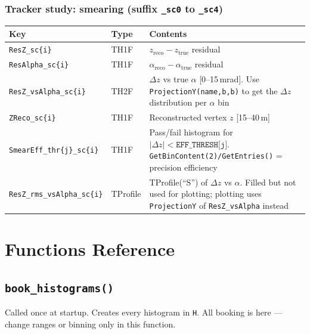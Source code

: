 \documentclass[11pt]{article}
\begin{document}
\subsubsection*{Tracker study: smearing (suffix \texttt{\_sc0} to \texttt{\_sc4})}
\begin{longtable}{p{4.8cm}lp{5.7cm}}
\toprule
Key & Type & Contents \\
\midrule
\texttt{ResZ\_sc\{i\}} & TH1F & $z_\text{reco} - z_\text{true}$ residual \\
\texttt{ResAlpha\_sc\{i\}} & TH1F & $\alpha_\text{reco} - \alpha_\text{true}$ residual \\
\texttt{ResZ\_vsAlpha\_sc\{i\}} & TH2F & $\Delta z$ vs true $\alpha$ [0--15\,mrad].
                                         Use \texttt{ProjectionY(name,b,b)} to get
                                         the $\Delta z$ distribution per $\alpha$ bin \\
\texttt{ZReco\_sc\{i\}} & TH1F & Reconstructed vertex $z$ [15--40\,m] \\
\texttt{SmearEff\_thr\{j\}\_sc\{i\}} & TH1F & Pass/fail histogram for
                                              $|\Delta z| < \texttt{EFF\_THRESH[j]}$.
                                              \texttt{GetBinContent(2)/GetEntries()}
                                              = precision efficiency \\
\texttt{ResZ\_rms\_vsAlpha\_sc\{i\}} & TProfile & TProfile(``S'') of $\Delta z$ vs $\alpha$.
                                                   Filled but not used for plotting;
                                                   plotting uses \texttt{ProjectionY}
                                                   of \texttt{ResZ\_vsAlpha} instead \\
\bottomrule
\end{longtable}

\section{Functions Reference}

\subsection{\texttt{book\_histograms()}}

Called once at startup. Creates every histogram in \texttt{H}. All
booking is here --- change ranges or binning only in this function.
\end{document}

